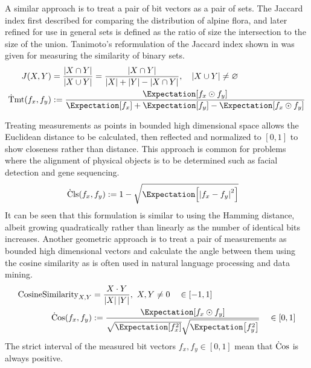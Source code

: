 \documentclass[runningheads]{llncs}
\begin{document}
A similar approach is to treat a pair of bit vectors as a pair of
sets.
The Jaccard index first described for comparing the distribution of alpine
flora\cite{JaccardAlpineFlora}, and later refined for use in general sets
is defined as the ratio of size the intersection to the size of the union.
Tanimoto's reformulation\cite{RogersTanimoto1960} of the Jaccard index
shown in  was given for measuring the similarity of binary
sets.
\begin{align}
\label{eq:tanimoto}
J(X, Y) &= \frac{\left| X \cap Y \right|}
                {\left| X \cup Y \right|}
         = \frac{\left| X \cap Y \right|}
                {\left| X \right| + \left| Y \right| - \left| X \cap Y \right|}
,\quad \left| X \cup Y \right| \neq \varnothing
\\
\label{eq:def_Tmt}
\Tmt(f_x, f_y) &:=
    \frac{ \sEx{f_x \odot f_y} }
         { \sEx{f_x} + \sEx{f_y} - \sEx{f_x \odot f_y} }
\end{align}

Treating measurements as points in bounded high dimensional space allows the
Euclidean distance to be calculated, then reflected and normalized to $[0,1]$
to show closeness rather than distance.
This approach is common for problems where the alignment of physical objects is
to be determined such as facial detection and gene
sequencing\cite{ClusteringByPassingMessages}.
\begin{align}
\label{eq:def_Cls}
\Cls(f_x, f_y) &:= 1 -
    \sqrt{\sEx{\left| f_x - f_y \right|^2}}
\end{align}
It can be seen that this formulation is similar to using the Hamming distance,
albeit growing quadratically rather than linearly as the number of identical
bits increases.
Another geometric approach is to treat a pair of measurements as bounded high
dimensional vectors and calculate the angle between them using the cosine
similarity as is often used in natural language processing\cite{Word2Vec}
and data mining\cite{SemanticCosineSimilarity}.
\begin{align}
\label{eq:cosinesimilarity}
\text{CosineSimilarity}_{X,Y} &=
  \frac{X \cdot Y}{\left| X \right| \left| Y \right|}, \ X,Y \neq 0
\quad \in [-1,1]
\\
\label{eq:def_Cos}
\Cos(f_x, f_y) &:=
  \frac{ \sEx{f_x \odot f_y} }
       { \sqrt{\sEx{f_x^2}} \sqrt{\sEx{f_y^2}} }
\quad \in [0,1]
\end{align}
The strict interval of the measured bit vectors $f_x, f_y \in [0,1]$ mean that
$\operatorname{\dot{C}os}$ is always positive.
\end{document}
